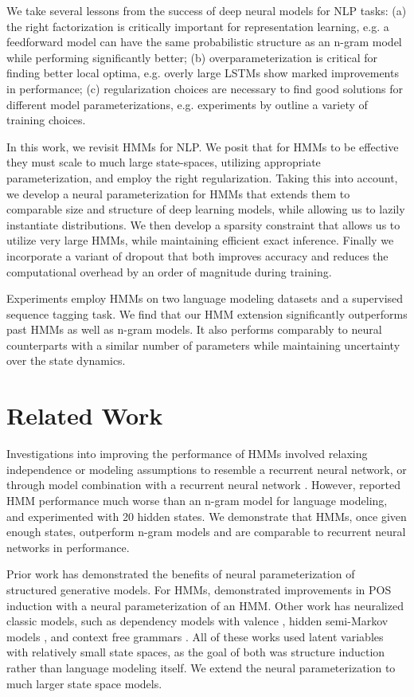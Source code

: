 \documentclass[11pt,a4paper]{article}
\begin{document}
We take several lessons from the success of deep neural models for NLP tasks:
(a) the right factorization is critically important for representation learning, e.g. a feedforward model \citet{bengio2003nlm}
can have the same probabilistic structure as an n-gram model while performing significantly better;
(b) overparameterization is critical for finding better local optima,
e.g. overly large LSTMs \citet{zaremba2014lstm} show marked improvements in performance;
(c) regularization choices are necessary to find good solutions for different model parameterizations,
e.g. experiments by \citet{merity2017awdlstm} outline a variety of training choices.

In this work, we revisit HMMs for NLP. We posit that for HMMs to be 
effective they must scale to much large state-spaces, utilizing appropriate parameterization, and 
employ the right regularization.
Taking this into account, we develop a neural parameterization for HMMs that extends 
them to comparable size and structure of deep learning models,
while allowing us to lazily instantiate distributions.
We then develop a sparsity constraint that allows us to utilize very large HMMs,
while maintaining efficient exact inference.
Finally we incorporate a variant of dropout that both improves accuracy
and reduces the computational overhead by an order of magnitude during training. 

Experiments employ HMMs on two language modeling datasets and a supervised sequence tagging task.
We find that our HMM extension significantly outperforms past HMMs as well as n-gram models. 
It also performs comparably to neural counterparts with a similar number of parameters
while maintaining uncertainty over the state dynamics.

\section{Related Work}
Investigations into improving the performance of HMMs
involved relaxing independence or modeling assumptions \citep{buys2018hmm}
to resemble a recurrent neural network, or through model combination
with a recurrent neural network \citep{krakovna2016hmm}.
However, \citet{buys2018hmm} reported HMM performance much worse than
an n-gram model for language modeling, and \citep{krakovna2016hmm}
experimented with 20 hidden states.
We demonstrate that HMMs, once given enough states,
outperform n-gram models and are comparable to
recurrent neural networks in performance.

Prior work has demonstrated the benefits of neural parameterization of structured generative models. 
For HMMs, \citet{tran2016hmm} demonstrated improvements in POS induction with a
neural parameterization of an HMM.
Other work has neuralized classic models, such as 
dependency models with valence \citep{han2017dependency},
hidden semi-Markov models \citep{wiseman2018hsmm},
and context free grammars \citep{kim2019cpcfg}.
All of these works used latent variables with relatively small state spaces,
as the goal of both was structure induction rather than language modeling itself.
We extend the neural parameterization to much larger state space models.
\end{document}
